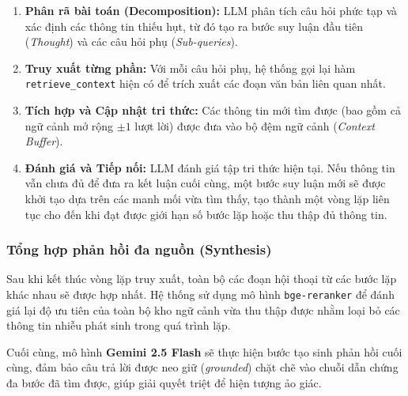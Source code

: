 \begin{enumerate}
    \item \textbf{Phân rã bài toán (Decomposition):} LLM phân tích câu hỏi phức tạp và xác định các thông tin thiếu hụt, từ đó tạo ra bước suy luận đầu tiên (\textit{Thought}) và các câu hỏi phụ (\textit{Sub-queries}).
    \item \textbf{Truy xuất từng phần:} Với mỗi câu hỏi phụ, hệ thống gọi lại hàm \texttt{retrieve\_context} hiện có để trích xuất các đoạn văn bản liên quan nhất. 
    \item \textbf{Tích hợp và Cập nhật tri thức:} Các thông tin mới tìm được (bao gồm cả ngữ cảnh mở rộng $\pm 1$ lượt lời) được đưa vào bộ đệm ngữ cảnh (\textit{Context Buffer}). 
    \item \textbf{Đánh giá và Tiếp nối:} LLM đánh giá tập tri thức hiện tại. Nếu thông tin vẫn chưa đủ để đưa ra kết luận cuối cùng, một bước suy luận mới sẽ được khởi tạo dựa trên các manh mối vừa tìm thấy, tạo thành một vòng lặp liên tục cho đến khi đạt được giới hạn số bước lặp hoặc thu thập đủ thông tin.
\end{enumerate}

\subsubsection{Tổng hợp phản hồi đa nguồn (Synthesis)}
Sau khi kết thúc vòng lặp truy xuất, toàn bộ các đoạn hội thoại từ các bước lặp khác nhau sẽ được hợp nhất. Hệ thống sử dụng mô hình \texttt{bge-reranker} để đánh giá lại độ ưu tiên của toàn bộ kho ngữ cảnh vừa thu thập được nhằm loại bỏ các thông tin nhiễu phát sinh trong quá trình lặp. 

Cuối cùng, mô hình \textbf{Gemini 2.5 Flash} sẽ thực hiện bước tạo sinh phản hồi cuối cùng, đảm bảo câu trả lời được neo giữ (\textit{grounded}) chặt chẽ vào chuỗi dẫn chứng đa bước đã tìm được, giúp giải quyết triệt để hiện tượng ảo giác.